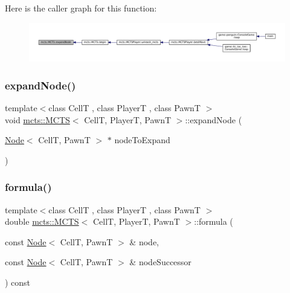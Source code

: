 Here is the caller graph for this function\+:
\nopagebreak
\begin{figure}[H]
\begin{center}
\leavevmode
\includegraphics[width=350pt]{classmcts_1_1_m_c_t_s_a8c65e74d070a037e5ad0331a39379c9c_icgraph}
\end{center}
\end{figure}
\mbox{\label{classmcts_1_1_m_c_t_s_a08a528ef0f9ad4b113d56b96718f6dfc}} 
\subsubsection{\texorpdfstring{expand\+Node()}{expandNode()}\hspace{0.1cm}{\footnotesize\ttfamily [2/2]}}
{\footnotesize\ttfamily template$<$class CellT , class PlayerT , class PawnT $>$ \\
void \hyperlink{classmcts_1_1_m_c_t_s}{mcts\+::\+M\+C\+TS}$<$ CellT, PlayerT, PawnT $>$\+::expand\+Node (\begin{DoxyParamCaption}\item[{\hyperlink{structmcts_1_1_node}{Node}$<$ CellT, PawnT $>$ $\ast$}]{node\+To\+Expand }\end{DoxyParamCaption})\hspace{0.3cm}{\ttfamily [protected]}}

\mbox{\label{classmcts_1_1_m_c_t_s_ac75ac1b12fbb40dca468f1c31a9fc8cd}} 
\subsubsection{\texorpdfstring{formula()}{formula()}}
{\footnotesize\ttfamily template$<$class CellT , class PlayerT , class PawnT $>$ \\
double \hyperlink{classmcts_1_1_m_c_t_s}{mcts\+::\+M\+C\+TS}$<$ CellT, PlayerT, PawnT $>$\+::formula (\begin{DoxyParamCaption}\item[{const \hyperlink{structmcts_1_1_node}{Node}$<$ CellT, PawnT $>$ \&}]{node,  }\item[{const \hyperlink{structmcts_1_1_node}{Node}$<$ CellT, PawnT $>$ \&}]{node\+Successor }\end{DoxyParamCaption}) const\hspace{0.3cm}{\ttfamily [protected]}}

